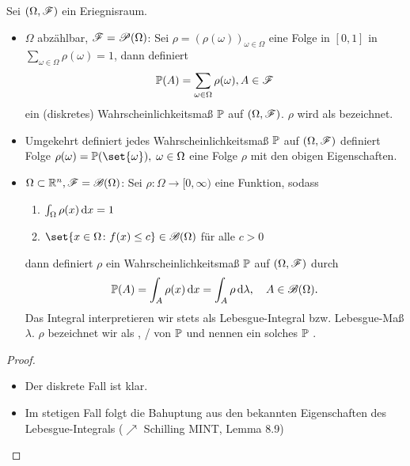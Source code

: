 \begin{proposition}
	Sei $(\Omega, \mathscr{F})$ ein Eriegnisraum.
	\begin{itemize}
		\item $\Omega$ abzählbar, $\mathscr{F} = \mathscr{P}(\Omega)$: Sei $\rho = (\rho(\omega))_{\omega \in \Omega}$ eine Folge in $[0,1]$ in $\sum_{\omega \in \Omega} \rho(\omega) = 1$, dann definiert
		\begin{align}
			\mathbb{P}(A) = \sum_{\omega \in \Omega} \rho(\omega), A \in \mathscr{F} \notag
		\end{align}
		ein (diskretes) Wahrscheinlichkeitsmaß $\mathbb{P}$ auf $(\Omega, \mathscr{F})$. $\rho$ wird als  bezeichnet.
		\item Umgekehrt definiert jedes Wahrscheinlichkeitsmaß $\mathbb{P}$ auf $(\Omega, \mathscr{F})$ definiert Folge $\rho(\omega) = \probp(\set{\omega}),\; \omega \in \Omega$ eine Folge $\rho$ mit den obigen Eigenschaften.
		\item $\Omega \subset \mathbb{R}^n, \mathscr{F} = \mathscr{B}(\Omega)$: Sei $\rho: \Omega \to [0, \infty)$ eine Funktion, sodass
		\begin{enumerate}
			\item $\int_{\Omega} \rho(x)\,\mathrm{d} x = 1$
			\item $\set{x \in \Omega \colon f(x) \le c} \in \borel(\Omega)$ für alle $c > 0$ 
		\end{enumerate}
		dann definiert $\rho$ ein Wahrscheinlichkeitsmaß $\mathbb{P}$ auf $(\Omega, \mathscr{F})$ durch 
		\begin{align}
		\mathbb{P}(A) = \int_{A} \rho(x) \,\mathrm{d} x = \int_{A} \rho \,\mathrm{d} \lambda, \quad A \in \mathscr{B}(\Omega).\notag
		\end{align}
		Das Integral interpretieren wir stets als Lebesgue-Integral bzw. Lebesgue-Maß $\lambda$.
		$\rho$ bezeichnet wir als , / von $\mathbb{P}$ und nennen ein solches $\mathbb{P}$ .
	\end{itemize}
\end{proposition}

\begin{proof}
	\begin{itemize}
		\item Der diskrete Fall ist klar.
		\item Im stetigen Fall folgt die Bahuptung aus den bekannten Eigenschaften des Lebesgue-Integrals ($\nearrow$ Schilling MINT, Lemma 8.9)
	\end{itemize}
\end{proof}

